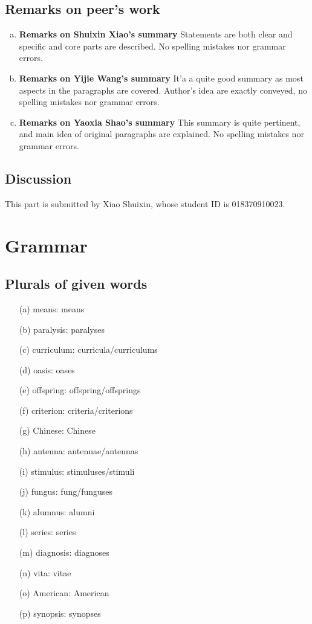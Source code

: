 \documentclass[paper=a4, fontsize=11pt]{scrartcl} %
\numberwithin{equation}{section} %
\numberwithin{figure}{section} %
\numberwithin{table}{section} %
\begin{document}
	\subsection{Remarks on peer's work}
		\begin{enumerate}[(a)]
			\item \textbf{Remarks on Shuixin Xiao's summary}\newline
				Statements are both clear and specific and core parts are described. No spelling mistakes nor grammar errors.
				 
			\item \textbf{Remarks on Yijie Wang's summary}\newline
				It'a a quite good summary as most aspects in the paragraphs are covered. Author's idea are exactly conveyed, no spelling mistakes nor grammar errors.
				
			\item \textbf{Remarks on Yaoxia Shao's summary}\newline
				This summary is quite pertinent, and main idea of original paragraphs are explained. No spelling mistakes nor grammar errors.
		\end{enumerate}
	
	\subsection{Discussion}
		This part is submitted by Xiao Shuixin, whose student ID is 018370910023.

\section{Grammar}
	\subsection{Plurals of given words}
		\begin{enumerate}
			\item[(a)] means: means
			\item[(b)] paralysis: paralyses
			\item[(c)] curriculum: curricula/curriculums
			\item[(d)] oasis: oases
			\item[(e)] offspring: offspring/offsprings
			\item[(f)] criterion: criteria/criterions
			\item[(g)] Chinese: Chinese
			\item[(h)] antenna: antennae/antennas
			\item[(i)] stimulus: stimuluses/stimuli
			\item[(j)] fungus: fung/funguses
			\item[(k)] alumnus: alumni
			\item[(l)] series: series
			\item[(m)] diagnosis: diagnoses
			\item[(n)] vita: vitae
			\item[(o)] American: American
			\item[(p)] synopsis: synopses
		\end{enumerate}
	
\end{document}
